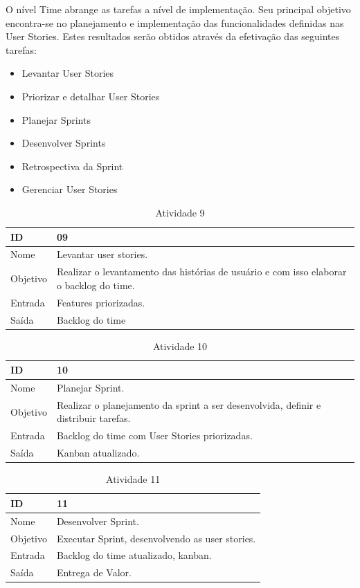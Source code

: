 O nível Time abrange as tarefas a nível de implementação. Seu principal objetivo encontra-se no planejamento e implementação das funcionalidades definidas nas User Stories.  Estes resultados serão obtidos através da efetivação das seguintes tarefas:

\begin{itemize}
\item Levantar User Stories
\item Priorizar e detalhar User Stories
\item Planejar Sprints
\item Desenvolver Sprints
\item Retrospectiva da Sprint
\item Gerenciar User Stories
\end{itemize}

\begin{table}[\htp]
\centering
\caption{Atividade 9}
\label{my-label}
\begin{tabular}{|l|l|}
\hline
ID       & 09                                             \\ \hline
Nome     & Levantar user stories. \\ \hline
Objetivo & Realizar o levantamento das histórias de usuário e com isso elaborar o backlog do time.
 \\ \hline
Entrada  &  Features priorizadas. \\ \hline
Saída    &  Backlog do time \\ \hline
\end{tabular}
\end{table}

\begin{table}[\htp]
\centering
\caption{Atividade 10}
\label{my-label}
\begin{tabular}{|l|l|}
\hline
ID       & 10                                             \\ \hline
Nome     & Planejar Sprint. \\ \hline
Objetivo & Realizar o planejamento da sprint a ser desenvolvida, definir e distribuir tarefas.
 \\ \hline
Entrada  &  Backlog do time com User Stories priorizadas. \\ \hline
Saída    &  Kanban atualizado.\\ \hline
\end{tabular}
\end{table}

\begin{table}[\htp]
\centering
\caption{Atividade 11}
\label{my-label}
\begin{tabular}{|l|l|}
\hline
ID       & 11                                            \\ \hline
Nome     & Desenvolver Sprint. \\ \hline
Objetivo & Executar Sprint, desenvolvendo as user stories.
 \\ \hline
Entrada  & Backlog do time atualizado, kanban. \\ \hline
Saída    &  Entrega de Valor.\\ \hline
\end{tabular}
\end{table}

